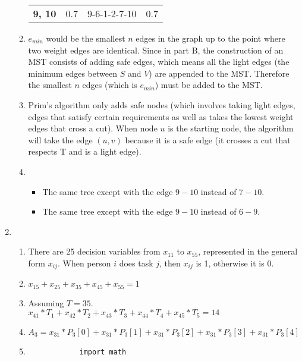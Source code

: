 \documentclass[11pt, letterpaper]{article}
\begin{document}
\begin{enumerate}
\begin{enumerate}
\begin{table}[h]
\begin{tabular}{llll}
          \textbf{9, 10}    & 0.7               & 9-6-1-2-7-10  & 0.7              \\
          \end{tabular}
          \end{table}
        \item
          $e_{min}$ would be the smallest $n$ edges in the graph up to the point where two weight edges are identical. Since
          in part B, the construction of an MST consists of adding safe edges, which means all the light edges (the minimum edges
          between $S$ and $V$) are appended to the MST. Therefore the smallest $n$ edges (which is $e_{min}$) must be added to the MST.
        \item
          Prim's algorithm only adds safe nodes (which involves taking light edges, edges that satisfy certain requirements
          as well as takes the lowest weight edges that cross a cut). When node $u$ is the starting node, the algorithm will take
          the edge $(u, v)$ because it is a safe edge (it crosses a cut that respects T and is a light edge).
        \item
          \begin{itemize}
            \item
              The same tree except with the edge $9-10$ instead of $7-10$.
            \item
              The same tree except with the edge $9-10$ instead of $6-9$.
          \end{itemize}
      \end{enumerate}
    \item
      \begin{enumerate}
        \item
          There are 25 decision variables from $x_{11}$ to $x_{55}$, represented in the general form $x_{ij}$. When person $i$ does
          task $j$, then $x_{ij}$ is 1, otherwise it is 0.
        \item
          $x_{15} + x_{25} + x_{35} + x_{45} + x_{55} = 1$
        \item
          Assuming $T = 35$. \\
          $x_{41}*T_1 + x_{42}*T_2 + x_{43}*T_3 + x_{44}*T_4 + x_{45}*T_5 = 14$
        \item
          $A_3 = x_{31}*P_{3}[0] + x_{31}*P_{3}[1] + x_{31}*P_{3}[2] + x_{31}*P_{3}[3] + x_{31}*P_{3}[4]$
        \item
          \begin{lstlisting}
            import math


\end{lstlisting}
\end{enumerate}
\end{enumerate}
\end{document}
